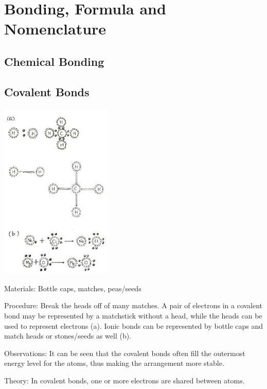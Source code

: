 \section{Bonding, Formula and Nomenclature}

\begin{multicols}{2}


\section*{Chemical Bonding}


\subsection{Covalent Bonds}

\begin{center}
\includegraphics[width=0.4\textwidth]{./img/source/covalent-bonds.jpg}
\end{center}

\begin{description*}
\item[Materials:]{Bottle caps, matches, peas/seeds}
\item[Procedure:]{Break the heads off of many matches. A pair of electrons in a covalent bond may be
represented by a matchstick without a  head, while the heads can be used to represent electrons (a). Ionic bonds can be represented by bottle caps
and match heads or stones/seeds as well (b).}
\item[Observations:]{It can be seen that the covalent bonds often fill the outermost energy level for the atoms, thus making the arrangement more stable.}
\item[Theory:]{In covalent bonds, one or more electrons are shared between atoms.}
\end{description*}


\end{multicols}
